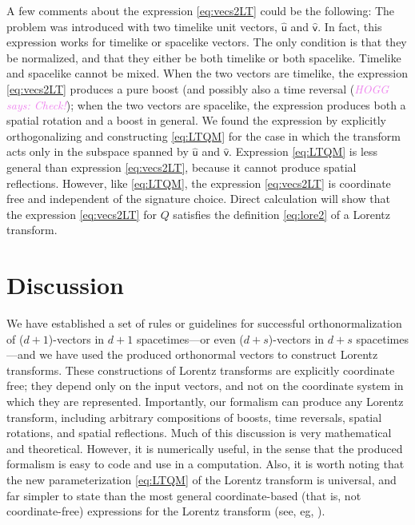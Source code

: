\documentclass{article}
\newcommand{\Lhat}[1]{\hat{\mathsf{#1}}} %
\newcommand{\plus}{\!+\!} %
\newcommand{\HOGG}[1]{\textcolor{violet}{\textsl{HOGG says: {#1}}}}
\begin{document}
A few comments about the expression \eqref{eq:vecs2LT} could be the following:
The problem was introduced with two timelike unit vectors, $\Lhat{u}$ and $\Lhat{v}$.
In fact, this expression works for timelike or spacelike vectors.
The only condition is that they be normalized, and that they either be both timelike or both spacelike.
Timelike and spacelike cannot be mixed.
When the two vectors are timelike, the expression \eqref{eq:vecs2LT} produces a pure boost (and possibly also a time reversal (\HOGG{Check!});
when the two vectors are spacelike, the expression produces both a spatial rotation and a boost in general.
We found the expression by explicitly orthogonalizing and constructing \eqref{eq:LTQM} for the case in which the transform acts only in the subspace spanned by $\Lhat{u}$ and $\Lhat{v}$.
Expression \eqref{eq:LTQM} is less general than expression \eqref{eq:vecs2LT}, because it cannot produce spatial reflections.
However, like \eqref{eq:LTQM}, the expression \eqref{eq:vecs2LT} is coordinate free and independent of the signature choice.
Direct calculation will show that the expression \eqref{eq:vecs2LT} for $Q$ satisfies the definition \eqref{eq:lore2} of a Lorentz transform.

\section{Discussion}\label{sec:discussion}

We have established a set of rules or guidelines for successful orthonormalization of ($d\plus1$)-vectors in $d\plus1$ spacetimes---or even ($d\plus s$)-vectors in $d\plus s$ spacetimes---and we have used the produced orthonormal vectors to construct Lorentz transforms.
These constructions of Lorentz transforms are explicitly coordinate free; they depend only on the input vectors, and not on the coordinate system in which they are represented.
Importantly, our formalism can produce any Lorentz transform, including arbitrary compositions of boosts, time reversals, spatial rotations, and spatial reflections.
Much of this discussion is very mathematical and theoretical.
However, it is numerically useful, in the sense that the produced formalism is easy to code and use in a computation.
Also, it is worth noting that the new parameterization \eqref{eq:LTQM} of the Lorentz transform is universal, and far simpler to state than the most general coordinate-based (that is, not coordinate-free) expressions for the Lorentz transform (see, eg, \cite{haber}).
\end{document}
